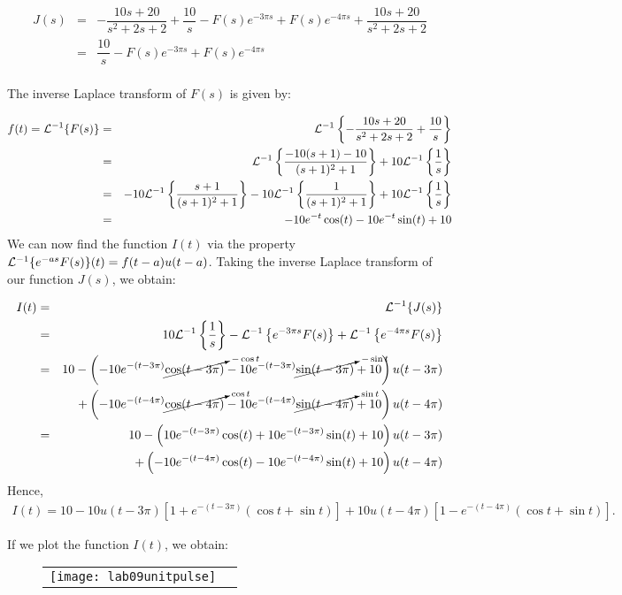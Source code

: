 \documentclass[11pt]{article}
\begin{document}
\begin{solution}
\begin{eqnarray*}
J(s)  & = &   -\dfrac{10s+20}{s^2+2s+2} + \dfrac{10}{s} -F(s)e^{-3\pi s} +F(s)e^{-4\pi s} + \dfrac{10s+20}{s^2+2s+2} \\
& = &    \dfrac{10}{s} -F(s)e^{-3\pi s} +F(s)e^{-4\pi s} \\
\end{eqnarray*}

The inverse Laplace transform of $F(s)$ is given by:

\begin{eqnarray*}
f(t) = {\cal L}^{-1}\{ F(s) \} & = & {\cal L}^{-1}\left\{ -\dfrac{10s+20}{s^2+2s+2} + \dfrac{10}{s} \right\} \\
& = & {\cal L}^{-1}\left\{ \dfrac{-10(s+1)-10}{(s+1)^2+1}\right\} +10 {\cal L}^{-1}\left\{ \dfrac{1}{s}\right\}\\
& = & -10{\cal L}^{-1}\left\{ \dfrac{s+1}{(s+1)^2+1}\right\} -10 {\cal L}^{-1}\left\{ \dfrac{1}{(s+1)^2+1}\right\} +10 {\cal L}^{-1}\left\{ \dfrac{1}{s}\right\}\\
&=& -10e^{-t}\cos(t)-10e^{-t}\sin(t) +10
\end{eqnarray*}
We can now find the function $I(t)$ via the property $ {\cal L}^{-1}\{ e^{-as}F(s) \}(t) = f(t-a)u(t-a)$. Taking the inverse Laplace transform of our function $J(s)$, we obtain:

\begin{eqnarray*}
I(t) & = & {\cal L}^{-1}\{ J(s) \}  \\
& = & 10 {\cal L}^{-1}\left\{ \dfrac{1}{s}\right\}  -{\cal L}^{-1}\left\{ e^{-3\pi s} F(s)\right\} + {\cal L}^{-1}\left\{ e^{-4\pi s} F(s)\right\} \\
& = & 10 - \left(-10e^{-(t-3\pi)}\cancelto{\scriptstyle -\cos t}{\cos(t-3\pi)}-10e^{-(t-3\pi)}\cancelto{\scriptstyle -\sin t}{\sin(t-3\pi)} +10\right)u(t-3\pi) \\
& & + \left(-10e^{-(t-4\pi)}\cancelto{\scriptstyle \cos t}{\cos(t-4\pi)}-10e^{-(t-4\pi)}\cancelto{\scriptstyle \sin t}{\sin(t-4\pi)} +10\right)u(t-4\pi) \\
& = & 10 - \left(10e^{-(t-3\pi)}\cos(t)+10e^{-(t-3\pi)}\sin(t) +10\right)u(t-3\pi) \\
& & + \left(-10e^{-(t-4\pi)}\cos(t)-10e^{-(t-4\pi)}\sin(t) +10\right)u(t-4\pi) 
\end{eqnarray*} 
Hence,
\begin{gather*}
\boxed{I(t) = 10 - 10 u(t-3\pi) \left[ 1+e^{-(t-3\pi )} \left(\cos t+\sin t\right)\right] + 10 u(t-4\pi) \left[1-e^{-(t-4\pi)}(\cos t+\sin t)\right]}.
\end{gather*}

If we plot the function $I(t)$, we obtain:
\begin{figure}[h]
\begin{center}
\begin{tabular}{cc} \texttt{[image: lab09unitpulse]} \\
\end{tabular}
\end{center}
\end{figure}
\end{solution}
\end{document}

